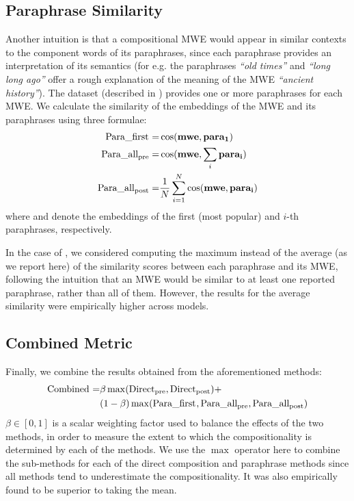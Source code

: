 \subsection{Paraphrase Similarity}
Another intuition is that a compositional MWE would appear in similar contexts to the component words of its paraphrases, since each paraphrase provides an interpretation of its semantics (for e.g. the paraphrases \textit{``old times''} and \textit{``long long ago''} offer a rough explanation of the meaning of the MWE \textit{``ancient history''}). The \ramisch dataset (described in ) provides one or more paraphrases for each MWE. We calculate the similarity of the embeddings of the MWE and its paraphrases using three formulae:
\begin{eqnarray}
\firstpara = & \cos(\MWEvec, \paravec[1])\\
\avgparapre = & \cos(\MWEvec, \sum_i \paravec[i])\\
\avgparapost = & \frac{1}{N} \sum_{i=1}^N \cos(\MWEvec, \paravec[i])
\end{eqnarray}
where \paravec[1] and \paravec[i] denote the embeddings of the first (most popular) and $i$-th paraphrases, respectively.

In the case of \avgparapost, we considered computing the maximum instead of the average (as we report here) of the similarity scores between each paraphrase and its MWE, following the intuition that an MWE would be similar to at least one reported paraphrase, rather than all of them. However, the results for the average similarity were empirically higher across models.
\subsection{Combined Metric}
Finally, we combine the results obtained from the aforementioned methods:
\begin{eqnarray}
  \begin{split}
    \combined = & \beta\max(\presum, \postsum) + \\
    & (1 - \beta)\max(\firstpara, \avgparapre, \avgparapost) \\
  \end{split}
\end{eqnarray}
$\beta\in[0,1]$ is a scalar weighting factor used to balance the effects of the two methods, in order to measure the extent to which the compositionality is determined by each of the methods. We use the $\max$ operator here to combine the sub-methods for each of the direct composition and paraphrase methods since all methods tend to underestimate the compositionality. It was also empirically found to be superior to taking the mean.


